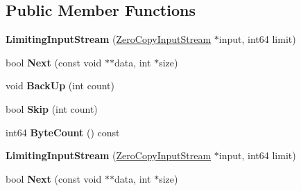 \subsection*{Public Member Functions}
\begin{DoxyCompactItemize}
\item 
\mbox{\label{classgoogle_1_1protobuf_1_1io_1_1LimitingInputStream_afcbaef4c1958f2c3f58da105048c603f}} 
{\bfseries Limiting\+Input\+Stream} (\hyperlink{classgoogle_1_1protobuf_1_1io_1_1ZeroCopyInputStream}{Zero\+Copy\+Input\+Stream} $\ast$input, int64 limit)
\item 
\mbox{\label{classgoogle_1_1protobuf_1_1io_1_1LimitingInputStream_af4af69f39b7d60bb7a43d0a3c558f8cb}} 
bool {\bfseries Next} (const void $\ast$$\ast$data, int $\ast$size)
\item 
\mbox{\label{classgoogle_1_1protobuf_1_1io_1_1LimitingInputStream_a2adfd17c336ec61b54c8faad5e599f5b}} 
void {\bfseries Back\+Up} (int count)
\item 
\mbox{\label{classgoogle_1_1protobuf_1_1io_1_1LimitingInputStream_a1a25b253b34bc51576e185d3dd560dcc}} 
bool {\bfseries Skip} (int count)
\item 
\mbox{\label{classgoogle_1_1protobuf_1_1io_1_1LimitingInputStream_a90b822e0f3341e0d40af50d4076380cf}} 
int64 {\bfseries Byte\+Count} () const
\item 
\mbox{\label{classgoogle_1_1protobuf_1_1io_1_1LimitingInputStream_afcbaef4c1958f2c3f58da105048c603f}} 
{\bfseries Limiting\+Input\+Stream} (\hyperlink{classgoogle_1_1protobuf_1_1io_1_1ZeroCopyInputStream}{Zero\+Copy\+Input\+Stream} $\ast$input, int64 limit)
\item 
\mbox{\label{classgoogle_1_1protobuf_1_1io_1_1LimitingInputStream_af4af69f39b7d60bb7a43d0a3c558f8cb}} 
bool {\bfseries Next} (const void $\ast$$\ast$data, int $\ast$size)
\item 

\end{DoxyCompactItemize}
